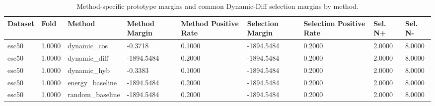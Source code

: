 \begin{table}[htbp]
\centering
\caption{Method-specific prototype margins and common Dynamic-Diff selection margins by method.}
\label{tab:dynamic-fpde-margin-summary}
\begin{tabular}{lllllllll}
\toprule
Dataset & Fold & Method & Method Margin & Method Positive Rate & Selection Margin & Selection Positive Rate & Sel. N+ & Sel. N- \\
\midrule
esc50 & 1.0000 & dynamic\_cos & -0.3718 & 0.1000 & -1894.5484 & 0.2000 & 2.0000 & 8.0000 \\
esc50 & 1.0000 & dynamic\_diff & -1894.5484 & 0.2000 & -1894.5484 & 0.2000 & 2.0000 & 8.0000 \\
esc50 & 1.0000 & dynamic\_hyb & -0.3383 & 0.1000 & -1894.5484 & 0.2000 & 2.0000 & 8.0000 \\
esc50 & 1.0000 & energy\_baseline & -1894.5484 & 0.2000 & -1894.5484 & 0.2000 & 2.0000 & 8.0000 \\
esc50 & 1.0000 & random\_baseline & -1894.5484 & 0.2000 & -1894.5484 & 0.2000 & 2.0000 & 8.0000 \\
\bottomrule
\end{tabular}
\end{table}
